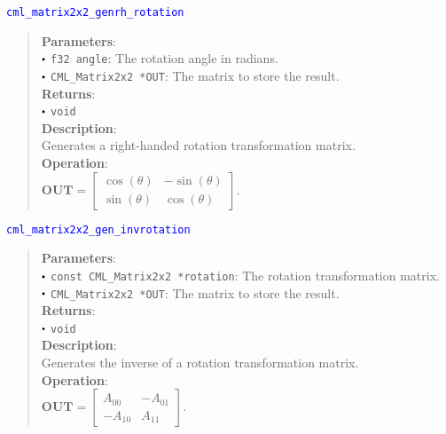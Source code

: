 \documentclass[a4paper,oneside,8pt]{extarticle}
\newcommand{\function}[1]{
  \noindent\textcolor{blue}{\texttt{#1}}
  \vspace{-0.3em}
}
\renewcommand{\dot}{\raisebox{0.3ex}{\scalebox{0.6}{$\bullet$}}}
\theoremstyle{definition}
\begin{document}
\function{cml\_matrix2x2\_genrh\_rotation}
\begin{quote}
  \textbf{Parameters}: \\
  $\dot$ \texttt{f32 angle}: The rotation angle in radians. \\
  $\dot$ \texttt{CML\_Matrix2x2 *OUT}: The matrix to store the result. \\
  \textbf{Returns}: \\
  $\dot$ \texttt{void} \\

  \vspace{-0.75em}
  \textbf{Description}: \\
  Generates a right-handed rotation transformation matrix. \\

  \vspace{-0.75em}
  \textbf{Operation}: \\
  $\mathbf{OUT} = \begin{bmatrix}
  \cos(\theta) & -\sin(\theta) \\
  \sin(\theta) & \cos(\theta)
  \end{bmatrix}$. \\
\end{quote}

\function{cml\_matrix2x2\_gen\_invrotation}
\begin{quote}
  \textbf{Parameters}: \\
  $\dot$ \texttt{const CML\_Matrix2x2 *rotation}: The rotation transformation matrix. \\
  $\dot$ \texttt{CML\_Matrix2x2 *OUT}: The matrix to store the result. \\
  \textbf{Returns}: \\
  $\dot$ \texttt{void} \\

  \vspace{-0.75em}
  \textbf{Description}: \\
  Generates the inverse of a rotation transformation matrix. \\

  \vspace{-0.75em}
  \textbf{Operation}: \\
  $\mathbf{OUT} = \begin{bmatrix}
  A_{00} & -A_{01} \\
  -A_{10} & A_{11}
  \end{bmatrix}$. \\
\end{quote}
\end{document}
